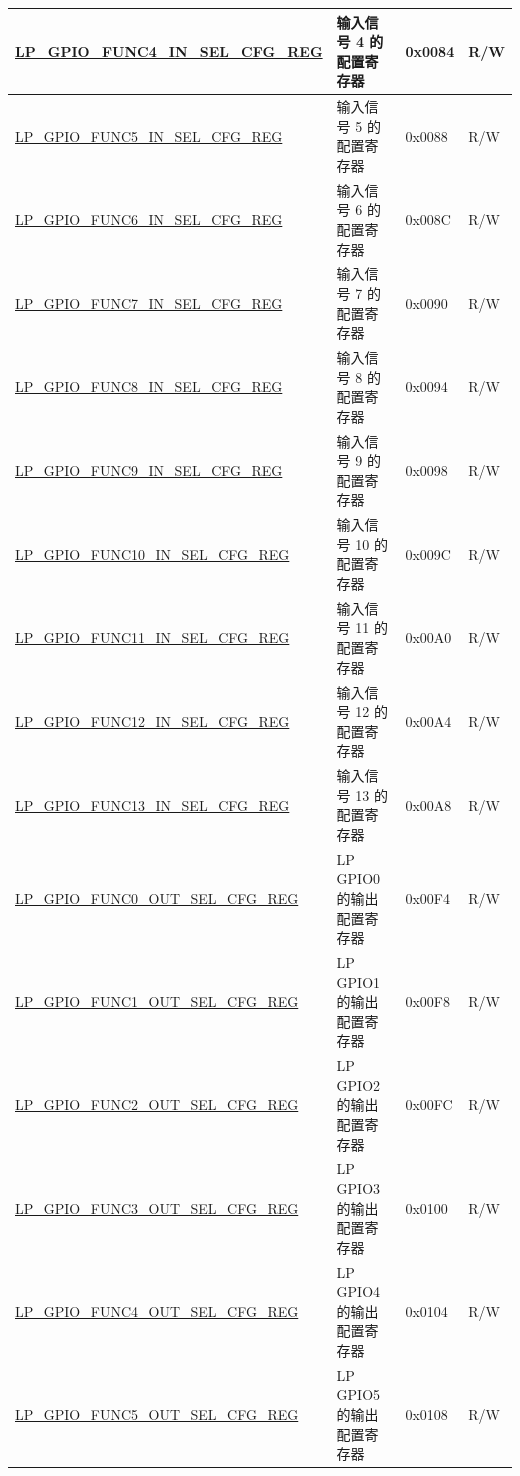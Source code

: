 \begin{longtable}{ | p{6.2cm} | p{6.9cm} | p{1.3cm} | p{1.8cm} | }
\hyperref[regdesc:LPGPIOFUNCNINSELCFGREG]{LP\_GPIO\_FUNC4\_IN\_SEL\_CFG\_REG} & 输入信号 4 的配置寄存器 & 0x0084 & R/W \\ \hline
\hyperref[regdesc:LPGPIOFUNCNINSELCFGREG]{LP\_GPIO\_FUNC5\_IN\_SEL\_CFG\_REG} & 输入信号 5 的配置寄存器 & 0x0088 & R/W \\ \hline
\hyperref[regdesc:LPGPIOFUNCNINSELCFGREG]{LP\_GPIO\_FUNC6\_IN\_SEL\_CFG\_REG} & 输入信号 6 的配置寄存器 & 0x008C & R/W \\ \hline
\hyperref[regdesc:LPGPIOFUNCNINSELCFGREG]{LP\_GPIO\_FUNC7\_IN\_SEL\_CFG\_REG} & 输入信号 7 的配置寄存器 & 0x0090 & R/W \\ \hline
\hyperref[regdesc:LPGPIOFUNCNINSELCFGREG]{LP\_GPIO\_FUNC8\_IN\_SEL\_CFG\_REG} & 输入信号 8 的配置寄存器 & 0x0094 & R/W \\ \hline
\hyperref[regdesc:LPGPIOFUNCNINSELCFGREG]{LP\_GPIO\_FUNC9\_IN\_SEL\_CFG\_REG} & 输入信号 9 的配置寄存器 & 0x0098 & R/W \\ \hline
\hyperref[regdesc:LPGPIOFUNCNINSELCFGREG]{LP\_GPIO\_FUNC10\_IN\_SEL\_CFG\_REG} & 输入信号 10 的配置寄存器 & 0x009C & R/W \\ \hline
\hyperref[regdesc:LPGPIOFUNCNINSELCFGREG]{LP\_GPIO\_FUNC11\_IN\_SEL\_CFG\_REG} & 输入信号 11 的配置寄存器 & 0x00A0 & R/W \\ \hline
\hyperref[regdesc:LPGPIOFUNCNINSELCFGREG]{LP\_GPIO\_FUNC12\_IN\_SEL\_CFG\_REG} & 输入信号 12 的配置寄存器 & 0x00A4 & R/W \\ \hline
\hyperref[regdesc:LPGPIOFUNCNINSELCFGREG]{LP\_GPIO\_FUNC13\_IN\_SEL\_CFG\_REG} & 输入信号 13 的配置寄存器 & 0x00A8 & R/W \\ \hline
\hyperref[regdesc:LPGPIOFUNCNOUTSELCFGREG]{LP\_GPIO\_FUNC0\_OUT\_SEL\_CFG\_REG} & LP GPIO0 的输出配置寄存器 & 0x00F4 & R/W \\ \hline
\hyperref[regdesc:LPGPIOFUNCNOUTSELCFGREG]{LP\_GPIO\_FUNC1\_OUT\_SEL\_CFG\_REG} & LP GPIO1 的输出配置寄存器 & 0x00F8 & R/W \\ \hline
\hyperref[regdesc:LPGPIOFUNCNOUTSELCFGREG]{LP\_GPIO\_FUNC2\_OUT\_SEL\_CFG\_REG} & LP GPIO2 的输出配置寄存器 & 0x00FC & R/W \\ \hline
\hyperref[regdesc:LPGPIOFUNCNOUTSELCFGREG]{LP\_GPIO\_FUNC3\_OUT\_SEL\_CFG\_REG} & LP GPIO3 的输出配置寄存器 & 0x0100 & R/W \\ \hline
\hyperref[regdesc:LPGPIOFUNCNOUTSELCFGREG]{LP\_GPIO\_FUNC4\_OUT\_SEL\_CFG\_REG} & LP GPIO4 的输出配置寄存器 & 0x0104 & R/W \\ \hline
\hyperref[regdesc:LPGPIOFUNCNOUTSELCFGREG]{LP\_GPIO\_FUNC5\_OUT\_SEL\_CFG\_REG} & LP GPIO5 的输出配置寄存器 & 0x0108 & R/W \\ \hline

\end{longtable}
